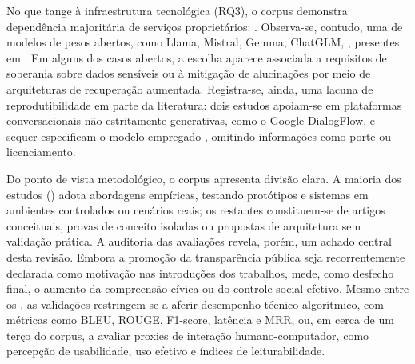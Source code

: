 No que tange à infraestrutura tecnológica (RQ3), o corpus demonstra dependência majoritária de serviços proprietários: . Observa-se, contudo, uma  de modelos de pesos abertos, como Llama, Mistral, Gemma, ChatGLM, , presentes em . Em alguns dos casos abertos, a escolha aparece associada a requisitos de soberania sobre dados sensíveis ou à mitigação de alucinações por meio de arquiteturas de recuperação aumentada. Registra-se, ainda, uma lacuna de reprodutibilidade em parte da literatura: dois estudos apoiam-se em plataformas conversacionais não estritamente generativas, como o Google DialogFlow, e  sequer especificam o modelo empregado , omitindo informações como porte ou licenciamento.

Do ponto de vista metodológico, o corpus apresenta divisão clara. A maioria dos estudos () adota abordagens empíricas, testando protótipos e sistemas em ambientes controlados ou cenários reais; os  restantes constituem-se de artigos conceituais, provas de conceito isoladas ou propostas de arquitetura sem validação prática. A auditoria das avaliações revela, porém, um achado central desta revisão. Embora a promoção da transparência pública seja recorrentemente declarada como motivação nas introduções dos trabalhos,  mede, como desfecho final, o aumento da compreensão cívica ou do controle social efetivo. Mesmo entre os , as validações restringem-se a aferir desempenho técnico-algorítmico, com métricas como BLEU, ROUGE, F1-score, latência e MRR, ou, em cerca de um terço do corpus, a avaliar proxies de interação humano-computador, como percepção de usabilidade, uso efetivo e índices de leiturabilidade. 


